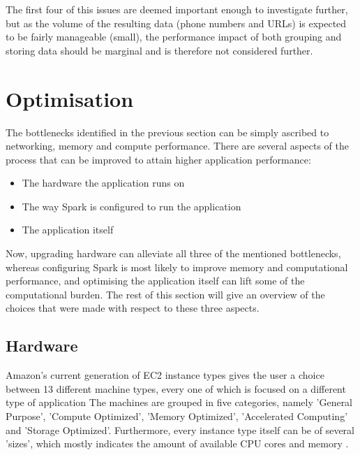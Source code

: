 \documentclass{article}
\begin{document}
The first four of this issues are deemed important enough to investigate further, but as the volume of the resulting data (phone numbers and URLs) is expected to be fairly manageable (small), the performance impact of both grouping and storing data should be marginal and is therefore not considered further.

\section{Optimisation}

The bottlenecks identified in the previous section can be simply ascribed to networking, memory and compute performance.
There are several aspects of the process that can be improved to attain higher application performance:

\begin{itemize}
	\item The hardware the application runs on
	\item The way Spark is configured to run the application
	\item The application itself
\end{itemize}

Now, upgrading hardware can alleviate all three of the mentioned bottlenecks, whereas configuring Spark is most likely to improve memory and computational performance, and optimising the application itself can lift some of the computational burden.
The rest of this section will give an overview of the choices that were made with respect to these three aspects.

\subsection{Hardware}
Amazon's current generation of EC2 instance types gives the user a choice between 13 different machine types, every one of which is focused on a different type of application
The machines are grouped in five categories, namely 'General Purpose', 'Compute Optimized', 'Memory Optimized', 'Accelerated Computing' and 'Storage Optimized'.
Furthermore, every instance type itself can be of several 'sizes', which mostly indicates the amount of available CPU cores and memory \cite{amazon2017instance}.
\end{document}
